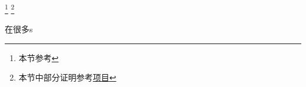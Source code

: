
\footnote{本节参考\cite{量子信息}}
\footnote{本节中部分证明参考\href{https://github.com/goropikari/SolutionQCQINielsenChuang}{项目}}


在很多s